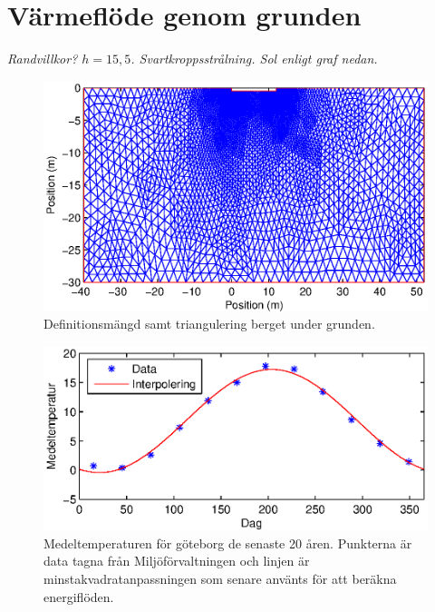 \section{Värmeflöde genom grunden}

\emph{\color{red} Randvillkor? $h=15,5$. Svartkroppsstrålning. Sol enligt graf nedan.}

\begin{figure}
\centering
\includegraphics{images/trifoundation.eps}
\caption{Definitionsmängd samt triangulering berget under grunden.}
\end{figure}


\begin{figure}
\centering
\includegraphics{images/meantemperature.eps}
\caption{
Medeltemperaturen för göteborg de senaste 20 åren. Punkterna är data tagna från Miljöförvaltningen och linjen är minstakvadratanpassningen som senare använts för att beräkna energiflöden.}
\end{figure}
